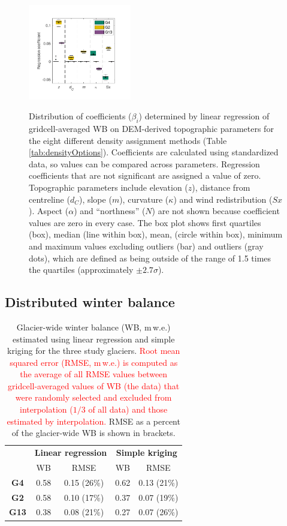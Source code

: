 \documentclass[twocolumn, letterpaper]{igs}
\begin{document}
\begin{figure}
	\centering
	\includegraphics[width =0.4\textwidth]{BetaCoeffs.pdf}\\
	\caption{Distribution of coefficients ($\beta_i$) determined by linear regression of gridcell-averaged WB on DEM-derived topographic parameters for the eight different density assignment methods (Table \ref{tab:densityOptions}). Coefficients are calculated using standardized data, so values can be compared across parameters. Regression coefficients that are not significant are assigned a value of zero. Topographic parameters include elevation ($z$), distance from centreline ($d_C$), slope ($m$), curvature ($\kappa$) and wind redistribution ($Sx$).  Aspect ($\alpha$) and ``northness'' ($N$) are not shown because coefficient values are zero in every case. The box plot shows first quartiles (box), median (line within box), mean, (circle within box), minimum and maximum values excluding outliers (bar) and outliers (gray dots), which are defined as being outside of the range of 1.5 times the quartiles (approximately $\pm2.7\sigma$). }
	\label{fig:BetaCoeffs}
\end{figure}


\subsection{Distributed winter balance}
 
 \begin{table}[]
\centering
\caption{Glacier-wide winter balance (WB, m\,w.e.) estimated using linear regression and simple kriging for the three study glaciers. \textcolor{red}{Root mean squared error (RMSE, m\,w.e.) is computed as the average of all RMSE values between gridcell-averaged values of WB (the data) that were randomly selected and excluded from interpolation ($1/3$ of all data) and those estimated by interpolation.} RMSE as a percent of the glacier-wide WB is shown in brackets.}
\label{tab:WSMB&RMSE}
\begin{tabular}{c|cc|cc}
 & \multicolumn{2}{c|}{\textbf{Linear regression}} & \multicolumn{2}{c}{\textbf{Simple kriging}} \\
 & WB & RMSE & WB & RMSE \\ \hline
\textbf{G4} & 0.58 & 0.15 (26\%) & 0.62 & 0.13 (21\%) \\
\textbf{G2} & 0.58 & 0.10 (17\%) & 0.37 & 0.07 (19\%) \\
\textbf{G13} & 0.38 & 0.08 (21\%) & 0.27 & 0.07 (26\%)
\end{tabular}
\end{table}
\end{document}
